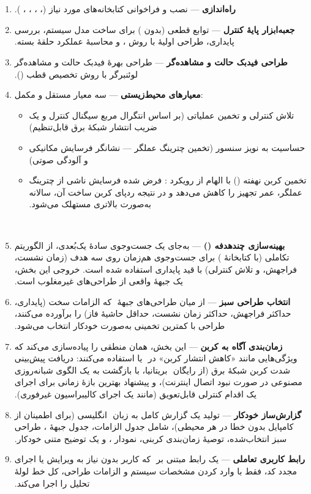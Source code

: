 ‫\documentclass[a4paper,12pt]{article}
\begin{document}
‫\begin{enumerate}
‫\item \textbf{راه‌اندازی} — نصب و فراخوانی کتابخانه‌های 
‫مورد نیاز (، ، ،
‫، ).
‫
‫\item \textbf{جعبه‌ابزار پایهٔ کنترل} — توابع قطعی (بدون
‫) برای ساخت مدل سیستم، بررسی پایداری، طراحی اولیهٔ 
‫با روش ، و محاسبهٔ عملکرد حلقهٔ بسته.
‫
‫\item \textbf{طراحی فیدبک حالت و مشاهده‌گر} — طراحی بهرهٔ فیدبک حالت
‫و مشاهده‌گر لوئنبرگر با روش تخصیص قطب ().
‫
‫\item \textbf{معیارهای محیط‌زیستی} — سه معیار مستقل و مکمل:
‫\begin{itemize}
‫\item تلاش کنترلی و تخمین  عملیاتی (بر اساس انتگرال مربع
‫سیگنال کنترل و یک ضریب انتشار شبکهٔ برق قابل‌تنظیم)
‫\item حساسیت به نویز سنسور (تخمین چترینگ عملگر — نشانگر فرسایش
‫مکانیکی و آلودگی صوتی)
‫\item تخمین کربن نهفته () با الهام از رویکرد
‫: فرض شده فرسایش ناشی از چترینگ عملگر، عمر تجهیز را کاهش
‫می‌دهد و در نتیجه ردپای کربن ساخت آن، سالانه به‌صورت بالاتری مستهلک
‫می‌شود.
‫\end{itemize}
‫
‫\item \textbf{بهینه‌سازی چندهدفه ()} — به‌جای یک جست‌وجوی
‫سادهٔ یک‌بُعدی، از الگوریتم تکاملی  (با کتابخانهٔ
‫) برای جست‌وجوی هم‌زمان روی سه هدف (زمان نشست، فراجهش، و
‫تلاش کنترلی) با قید پایداری استفاده شده است. خروجی این بخش، یک
‫جبههٔ  واقعی از طراحی‌های غیرمغلوب است.
‫
‫\item \textbf{انتخاب طراحی سبز} — از میان طراحی‌های جبههٔ
‫ که الزامات سخت (پایداری، حداکثر فراجهش، حداکثر زمان
‫نشست، حداقل حاشیهٔ فاز) را برآورده می‌کنند، طراحی با کمترین 
‫تخمینی به‌صورت خودکار انتخاب می‌شود.
‫
‫\item \textbf{زمان‌بندی آگاه به کربن} — این بخش، همان منطقی را
‫پیاده‌سازی می‌کند که ویژگی‌هایی مانند «کاهش انتشار کربن» در
‫ یا  استفاده می‌کنند:
‫دریافت پیش‌بینی شدت کربن شبکهٔ برق (از  رایگان
‫ بریتانیا، با بازگشت به یک الگوی شبانه‌روزی
‫مصنوعی در صورت نبود اتصال اینترنت)، و پیشنهاد بهترین بازهٔ زمانی برای
‫اجرای یک اقدام کنترلی قابل‌تعویق (مانند یک اجرای کالیبراسیون
‫غیرفوری).
‫
‫\item \textbf{گزارش‌ساز خودکار} — تولید یک گزارش کامل به زبان
‫ انگلیسی (برای اطمینان از کامپایل بدون خطا در هر
‫محیطی)، شامل جدول الزامات، جدول جبههٔ ، طراحی سبز
‫انتخاب‌شده، توصیهٔ زمان‌بندی کربنی، نمودار ، و یک
‫توضیح متنی خودکار.
‫
‫\item \textbf{رابط کاربری تعاملی} — یک رابط مبتنی بر
‫ که کاربر بدون نیاز به ویرایش یا اجرای مجدد کد، فقط با
‫وارد کردن مشخصات سیستم و الزامات طراحی، کل خط لولهٔ تحلیل را اجرا
‫می‌کند.
‫
‫\end{enumerate}
\end{document}
